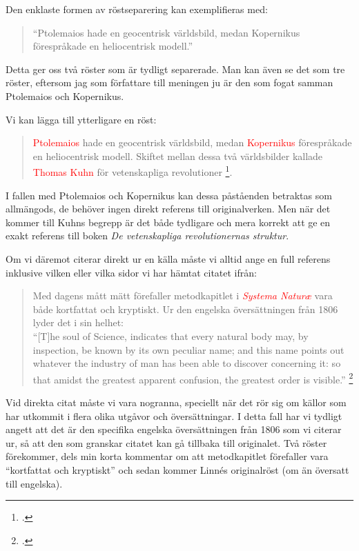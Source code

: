\documentclass[11pt,a4paper,footinclude=true,headinclude=true]{report} %
\begin{document}
Den enklaste formen av röstseparering kan exemplifieras med:

\begin{quote}
``Ptolemaios hade en geocentrisk världsbild, medan Kopernikus förespråkade en heliocentrisk modell.''
\end{quote}

\noindent Detta ger oss två röster som är tydligt separerade. Man kan även se det som tre röster, eftersom jag som författare till meningen ju är den som fogat samman Ptolemaios och Kopernikus. 

Vi kan lägga till ytterligare en röst:

\begin{quote}
\textcolor{red}{Ptolemaios} hade en geocentrisk världsbild, medan \textcolor{red}{Kopernikus} förespråkade en heliocentrisk modell. Skiftet mellan dessa två världsbilder kallade \textcolor{red}{Thomas Kuhn} för vetenskapliga revolutioner \footcite{kuhnVetenskapligaRevolutionernasStruktur1979}.
\end{quote}

\noindent I fallen med Ptolemaios och Kopernikus kan dessa påståenden betraktas som allmängods, de behöver ingen direkt referens till originalverken. Men när det kommer till Kuhns begrepp är det både tydligare och mera korrekt att ge en exakt referens till boken \emph{De vetenskapliga revolutionernas struktur}.

Om vi däremot citerar direkt ur en källa måste vi alltid ange en full referens inklusive vilken eller vilka sidor vi har hämtat citatet ifrån:

\begin{quote}
\begin{footnotesize}
Med dagens mått mätt förefaller metodkapitlet i \textcolor{red}{\emph{Systema Naturæ}} vara både kortfattat och kryptiskt. Ur den engelska översättningen från 1806 lyder det i sin helhet: 
\\ 
``[T]he soul of Science, indicates that every natural body may, by inspection, be known by its own peculiar name; and this name points out whatever the industry of man has been able to discover concerning it: so that amidst the greatest apparent confusion, the greatest order is visible.'' \footcite[s. 3]{linneGeneralSystemNature1806}
\end{footnotesize}
\end{quote}

\noindent Vid direkta citat måste vi vara nogranna, speciellt när det rör sig om källor som har utkommit i flera olika utgåvor och översättningar. I detta fall har vi tydligt angett att det är den specifika engelska översättningen från 1806 som vi citerar ur, så att den som granskar citatet kan gå tillbaka till originalet. Två röster förekommer, dels min korta kommentar om att metodkapitlet förefaller vara ``kortfattat och kryptiskt'' och sedan kommer Linnés originalröst (om än översatt till engelska).
\end{document}
